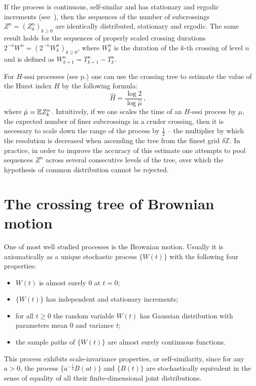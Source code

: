 If the process is continuous, self-similar and has stationary and ergodic increments
(see~\cite{jonesshen2005}), then the sequences of the number of subcrossings $Z^n = (Z_k^n)_{k\geq 0}$
are identically distributed, stationary and ergodic. The same result holds for
the sequences of properly scaled crossing durations $2^{-n} W^n = (2^{-n} W_k^n)_{k\geq0}$,
where $W_k^n$ is the duration of the $k$-th crossing of level $n$ and is defined
as $W_{k+1}^n = T_{k+1}^n - T_k^n$.

For $H$-sssi processes (see p.\pageref{def:hsssi}) one can use the crossing tree
to estimate the value of the Hurst index $H$ by the following formula:
\[ \hat{H} = \frac{\log 2}{\log \hat{\mu}} \,,\]
where $\hat{\mu} = \mathbb{E} Z_k^n$. Intuitively, if we one scales the time of an $H$-sssi
process by $\mu$, the expected number of finer subcrossings in a cruder crossing,
then it is necessary to scale down the range of the process by $\tfrac{1}{2}$ --
the multiplier by which the resolution is decreased when ascending the tree from
the finest grid $\delta \mathbb{Z}$. In practice, in order to improve the accuracy of
this estimate one attempts to pool sequences $Z^n$ across several consecutive levels
of the tree, over which the hypothesis of common distribution cannot be rejected.


\section{The crossing tree of Brownian motion} %
\label{sec:the_crossing_tree_of_brownian_motion}

One of most well studied processes is the Brownian motion. Usually it is axiomatically
as a unique stochastic process $\bigl\{W(t)\bigr\}$ with the following four properties:
\begin{itemize}
    \item $W(t)$ is almost surely $0$ at $t=0$;
    \item $\{W(t)\}$ has independent and stationary increments;
    \item for all $t\geq 0$ the random variable $W(t)$ has Gaussian distribution with
    parameters mean $0$ and variance $t$;
    \item the sample paths of $\{W(t)\}$ are almost surely continuous functions.
\end{itemize}
This process exhibits scale-invariance properties, or self-similarity, since for any
$a>0$, the process $\bigl\{a^{-\tfrac{1}{2}} B(at)\bigr\}$ and $\{B(t)\}$ are stochastically
equivalent in the sense of equality of all their finite-dimensional joint distributions.

